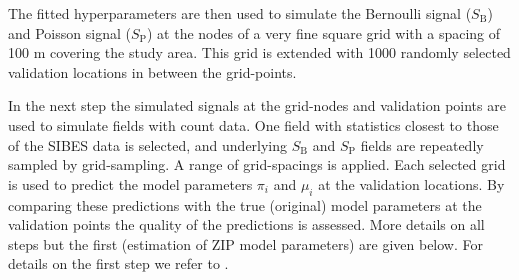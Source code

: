 \documentclass[review]{elsarticle}
\begin{document}
The fitted hyperparameters are then used to simulate the Bernoulli signal ($S_{\mathrm{B}}$) and Poisson signal ($S_{\mathrm{P}}$) at the nodes of a very fine square grid with a spacing of 100 m covering the study area. This grid is extended with 1000 randomly selected validation locations in between the grid-points. 


In the next step the simulated signals at the grid-nodes and validation points are used to simulate fields with count data. One field with statistics closest to those of the SIBES data is selected, and underlying $S_{\mathrm{B}}$ and $S_{\mathrm{P}}$ fields are repeatedly sampled by grid-sampling. A range of grid-spacings is applied. Each selected grid is used to predict the model parameters $\pi_i$ and $\mu_i$ at the validation locations.  By comparing these predictions with the true (original) model parameters at the validation points the quality of the predictions is assessed. More details on all steps but the first (estimation of ZIP model parameters) are given below. For details on the first step we refer to \citet{lyashevska2016a}.
\end{document}
